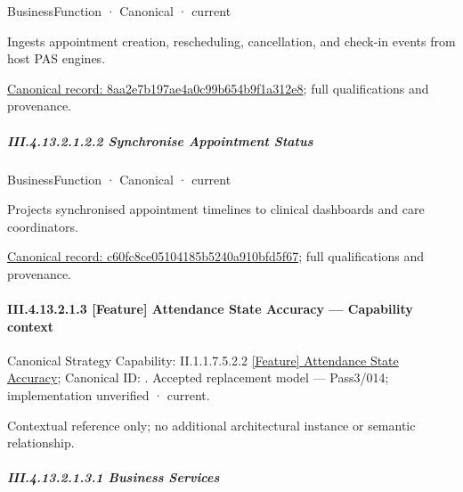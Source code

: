\label{element:8aa2e7b197ae4a0c99b654b9f1a312e8}
{\small BusinessFunction · Canonical · current}\par

Ingests appointment creation, rescheduling, cancellation, and check-in events from host PAS engines.


{\footnotesize \href{../../../../../../../continuum/business/business-function/8aa2e7b197ae4a0c99b654b9f1a312e8.md}{Canonical record: 8aa2e7b197ae4a0c99b654b9f1a312e8}; full qualifications and provenance.}\par
\subparagraph*{III.4.13.2.1.2.2 Synchronise Appointment Status}
\label{navigation:III.4.13.2.1.2.2}

\label{element:c60fc8ce05104185b5240a910bfd5f67}
{\small BusinessFunction · Canonical · current}\par

Projects synchronised appointment timelines to clinical dashboards and care coordinators.


{\footnotesize \href{../../../../../../../continuum/business/business-function/c60fc8ce05104185b5240a910bfd5f67.md}{Canonical record: c60fc8ce05104185b5240a910bfd5f67}; full qualifications and provenance.}\par
\paragraph*{III.4.13.2.1.3 [Feature] Attendance State Accuracy — Capability context}
\label{navigation:III.4.13.2.1.3}

{\small Canonical Strategy Capability: II.1.1.7.5.2.2 \hyperref[element:9fd06e573a6144b9a43ecebc8ead3baf]{[Feature] Attendance State Accuracy}; Canonical ID: \texttt{}. Accepted replacement model — Pass3/014; implementation unverified · current.}\par
Contextual reference only; no additional architectural instance or semantic relationship.\par
\subparagraph*{III.4.13.2.1.3.1 Business Services}
\label{navigation:III.4.13.2.1.3.1}

